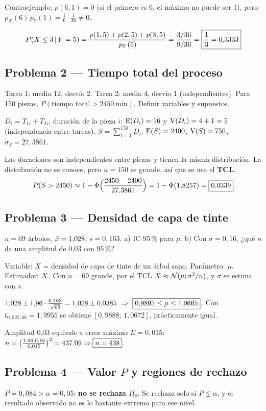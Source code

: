 Contraejemplo: $p(6,1)=0$ (si el primero es 6, el máximo no puede ser 1), pero $p_X(6)\,p_Y(1)=\frac16\cdot\frac1{36}\neq0$.

\[
P(X\le3\,|\,Y=5)=\frac{p(1,5)+p(2,5)+p(3,5)}{p_Y(5)}=\frac{3/36}{9/36}=\boxed{\frac13=0{,}3333}
\]

\subsection{Problema 2 --- Tiempo total del proceso}
\begin{enun}
Tarea 1: media 12, desvío 2. Tarea 2: media 4, desvío 1 (independientes). Para 150 piezas, $P(\text{tiempo total}>2450\ \text{min})$. Definir variables y supuestos.
\end{enun}
 $D_i=T_{1i}+T_{2i}$, duración de la pieza $i$: $\mathrm{E}(D_i)=16$ y $\mathrm{V}(D_i)=4+1=5$ (independencia entre tareas). $S=\sum_{i=1}^{150}D_i$: $\mathrm{E}(S)=2400$, $\mathrm{V}(S)=750$, $\sigma_S=27{,}3861$.

 Las duraciones son independientes entre piezas y tienen la misma distribución. La distribución no se conoce, pero $n=150$ es grande, así que se usa el \textbf{TCL}.
\[
P(S>2450)\approx1-\Phi\Big(\frac{2450-2400}{27{,}3861}\Big)=1-\Phi(1{,}8257)=\boxed{0{,}0339}
\]

\subsection{Problema 3 --- Densidad de capa de tinte}
\begin{enun}
$n=69$ árboles, $\bar{x}=1{,}028$, $s=0{,}163$. a) IC 95\,\% para $\mu$. b) Con $\sigma=0{,}16$, ¿qué $n$ da una amplitud de 0,03 con 95\,\%?
\end{enun}
 Variable: $X$ = densidad de capa de tinte de un árbol sano. Parámetro: $\mu$. Estimador: $\bar{X}$. Con $n=69$ grande, por el TCL $\bar{X}\approx\mathcal{N}(\mu;\sigma^2/n)$, y $\sigma$ se estima con $s$.

 $1{,}028\pm1{,}96\cdot\frac{0{,}163}{\sqrt{69}}=1{,}028\pm0{,}0385\ \Rightarrow\ \res{0{,}9895\le\mu\le1{,}0665}$. Con $t_{0,025;68}=1{,}9955$ se obtiene $[0{,}9888;\,1{,}0672]$, prácticamente igual.

 Amplitud 0,03 equivale a error máximo $E=0{,}015$: $n=\big(\frac{1{,}96\cdot0{,}16}{0{,}015}\big)^2=437{,}09\Rightarrow\boxed{n=438}$.

\subsection{Problema 4 --- Valor $P$ y regiones de rechazo}
 $P=0{,}084>\alpha=0{,}05$: \textbf{no se rechaza $H_0$}. Se rechaza solo si $P\le\alpha$, y el resultado observado no es lo bastante extremo para ese nivel.

